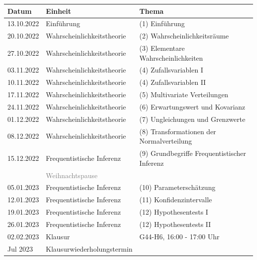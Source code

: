\documentclass[
  8pt,
  ignorenonframetext,
]{beamer}
\begin{document}
\begin{frame}{}
\protect\hypertarget{section-2}{}
\center
\footnotesize
\renewcommand{\arraystretch}{1.1}
\begin{tabular}{lll}
Datum        & Einheit                       & Thema                                                \\\hline
13.10.2022   & Einführung                    & (1) Einführung                                       \\
20.10.2022   & Wahrscheinlichkeitstheorie    & (2) Wahrscheinlichkeitsräume                         \\
27.10.2022   & Wahrscheinlichkeitstheorie    & (3) Elementare Wahrscheinlichkeiten                  \\
03.11.2022   & Wahrscheinlichkeitstheorie    & (4) Zufallsvariablen I                               \\
10.11.2022   & Wahrscheinlichkeitstheorie    & (4) Zufallsvariablen II                              \\
17.11.2022   & Wahrscheinlichkeitstheorie    & (5) Multivariate Verteilungen                        \\
24.11.2022   & Wahrscheinlichkeitstheorie    & (6) Erwartungswert und Kovarianz                     \\
01.12.2022   & Wahrscheinlichkeitstheorie    & (7) Ungleichungen und Grenzwerte                     \\
08.12.2022   & Wahrscheinlichkeitstheorie    & (8) Transformationen der Normalverteilung            \\
15.12.2022   & Frequentistische Inferenz     & (9) Grundbegriffe Frequentistischer Inferenz         \\
             & \textcolor{gray}{Weihnachtspause}                                                    \\
05.01.2023   & Frequentistische Inferenz     & (10) Parameterschätzung                              \\
12.01.2023   & Frequentistische Inferenz     & (11) Konfidenzintervalle                             \\
19.01.2023   & Frequentistische Inferenz     & (12) Hypothesentests I                               \\
26.01.2023   & Frequentistische Inferenz     & (12) Hypothesentests II                              \\\hline
02.02.2023   & Klausur                       & G44-H6, 16:00 - 17:00 Uhr                            \\
Jul 2023     & Klausurwiederholungstermin    &
\end{tabular}
\end{frame}
\end{document}
